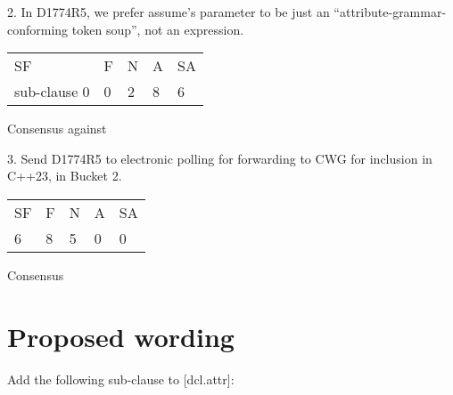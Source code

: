 2. In D1774R5, we prefer assume’s parameter to be just an “attribute-grammar-conforming token soup”, not an expression.

\hspace{6mm}
\begin{tabular}{lllll}
SF & F & N & A & SA \\sub-clause
0 & 0 & 2 & 8 & 6
\end{tabular}
\hspace{5mm}Consensus against

3. Send D1774R5 to electronic polling for forwarding to CWG for inclusion in C++23, in Bucket 2.

\hspace{6mm}
\begin{tabular}{lllll}
SF & F & N & A & SA \\
6 & 8 & 5 & 0 & 0
\end{tabular}
\hspace{5mm}Consensus



\section{Proposed wording}
\label{sec:wording}

Add the following sub-clause to [dcl.attr]:

